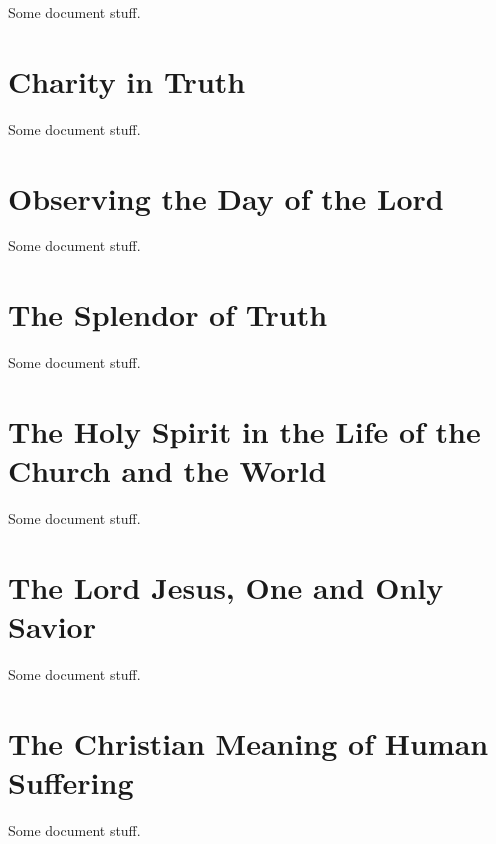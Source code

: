 \documentclass[oneside]{book}
\begin{document}
Some document stuff.


\chapter{Charity in Truth}

Some document stuff.


\chapter{Observing the Day of the Lord}

Some document stuff.


\chapter{The Splendor of Truth}

Some document stuff.


\chapter{The Holy Spirit in the Life of the Church and the World}

Some document stuff.


\chapter{The Lord Jesus, One and Only Savior}

Some document stuff.


\chapter{The Christian Meaning of Human Suffering}

Some document stuff.
\end{document}
